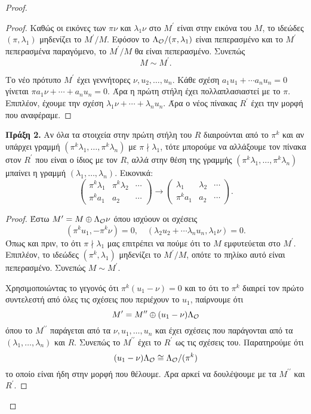 \begin{proof}
\begin{proof}
    \noindent Καθώς οι εικόνες των $\pi \nu$ και $\lambda_1 \nu$ στο $M^\prime$ είναι στην εικόνα του $M$, το ιδεώδες $(\pi,\lambda_1)$ 
    μηδενίζει το $M^\prime/M$. Εφόσον το $\Lambda_\mathcal{O}/(\pi,\lambda_1)$ είναι πεπερασμένο και το $M^\prime$ πεπερασμένα παραγόμενο, το $M^\prime/M$ θα είναι πεπερασμένο. Συνεπώς
    $$M \sim M^\prime .$$

    \noindent Το νέο πρότυπο $M^\prime$ έχει γεννήτορες $\nu,u_2,\ldots, u_n$. Κάθε σχέση $a_1 u_1 + \cdots a_n u_n = 0$ γίνεται $\pi a_1 \nu + \cdots + a_n u_n = 0$. Άρα η πρώτη στήλη έχει πολλαπλασιαστεί με το $\pi$. Επιπλέον, έχουμε την σχέση $\lambda_1 \nu + \cdots + \lambda_n u_n$. Άρα ο νέος πίνακας $R^\prime$ έχει την μορφή που αναφέραμε.
\end{proof}

\noindent \textbf{Πράξη 2.} Αν όλα τα στοιχεία στην πρώτη στήλη του $R$ διαιρούνται από το $\pi^k$ και αν υπάρχει 
γραμμή $(\pi^k\lambda_1,\ldots, \pi^k \lambda_n)$ με $\pi \nmid \lambda_1$, τότε μπορούμε να αλλάξουμε τον πίνακα στον 
$R^\prime$ που είναι ο ίδιος με τον $R$, αλλά στην θέση της γραμμής $(\pi^k\lambda_1,\ldots, \pi^k \lambda_n)$ μπαίνει η 
γραμμή $(\lambda_1,\ldots, \lambda_n)$. Εικονικά:
$$\begin{pmatrix}
    \pi^k \lambda_1 & \pi^k \lambda_2 & \cdots \\ 
    \pi^k a_1 & a_2 & \cdots 
\end{pmatrix} \longrightarrow \begin{pmatrix}
    \lambda_1 & \lambda_2 & \cdots \\
    \pi^k a_1 & a_2 & \cdots 
\end{pmatrix}.$$

\begin{proof} Έστω $M^\prime = M\oplus \Lambda_\mathcal{O} \nu$ όπου ισχύουν οι σχέσεις
    $$(\pi^k u_1, -\pi^k \nu) = 0, \quad (\lambda_2 u_2 + \cdots \lambda_n u_n, \lambda_1 \nu) = 0.$$
    Όπως και πριν, το ότι $\pi \nmid \lambda_1$ μας επιτρέπει να πούμε ότι το $M$ εμφυτεύεται στο $M^\prime$. Επιπλέον, το ιδεώδες $(\pi^k,\lambda_1)$ μηδενίζει το $M^\prime /M$, οπότε το πηλίκο αυτό είναι πεπερασμένο. Συνεπώς $M\sim M^\prime$.
    
    Χρησιμοποιώντας το γεγονός ότι $\pi^k (u_1 - \nu) = 0$ και το ότι το $\pi^k$ διαιρεί τον πρώτο συντελεστή από όλες τις σχέσεις που περιέχουν το $u_1$, παίρνουμε ότι
    $$M^\prime = M^{\prime \prime} \oplus (u_1 - \nu)\Lambda_\mathcal{O}$$
    όπου το $M^{\prime \prime}$ παράγεται από τα $\nu,u_1,\ldots, u_n$ και έχει σχέσεις που παράγονται από τα $(\lambda_1,\ldots, \lambda_n)$ και $R$. Συνεπώς το $M^{\prime \prime}$ έχει το $R^\prime$ ως τις σχέσεις του. Παρατηρούμε ότι
    $$(u_1 - \nu)\Lambda_\mathcal{O} \cong \Lambda_\mathcal{O} /(\pi^k)$$ το οποίο είναι ήδη στην μορφή που θέλουμε. Άρα αρκεί να δουλέψουμε με τα $M^{\prime \prime}$ και $R^\prime$.
\end{proof}


\end{proof}
